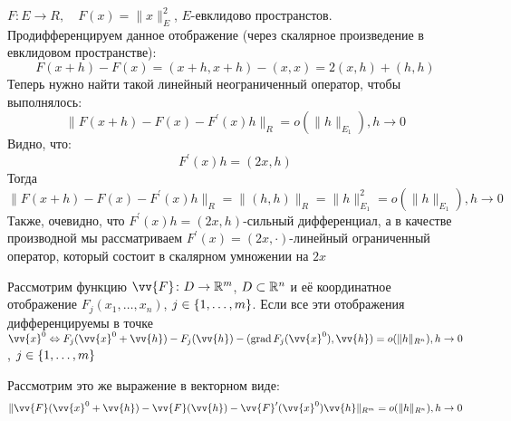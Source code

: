 \begin{example}
    $F \colon E \to R, \quad F(x)=\|x\|^2_E$, $E$-евклидово пространстов.\\ Продифференцируем данное отображение (через скалярное произведение в евклидовом пространстве)$\colon$
    \[
        F(x+h)-F(x)=(x+h, x+h)-(x,x)=2(x, h)+(h, h)
    \]
    Теперь нужно найти такой линейный неограниченный оператор, чтобы выполнялось$\colon$
    \[
        \|F(x+h)-F(x)-F^\prime(x) h\|_R=o(\|h\|_{E_1}), h \to 0
    \]
    Видно, что$\colon$
    \[
        F^\prime(x) h = (2x, h)
    \]
    Тогда
    \[
        \|F(x+h)-F(x)-F^\prime(x) h\|_R = \|(h, h)\|_R = \|h\|^2_{E_1} = o(\|h\|_{E_1}), h \to 0
    \]
    Также, очевидно, что $F^\prime(x) h = (2x, h)$-сильный дифференциал, а в качестве производной мы рассматриваем $F^\prime(x)=(2x, \cdot)$-линейный ограниченный оператор, который состоит в скалярном умножении на $2x$
\end{example}

\begin{example}
    Рассмотрим функцию $\vv{F} \colon D \to \R^m$, $D \subset \mathbb{R}^n$ и её координатное отображение $F_j(x_1, \ldots, x_n)$, $j \in \{1, \ldots, m\}$. Если все эти отображения дифференцируемы в точке $\vv{x}^0 \Lra F_j(\vv{x}^0 + \vv{h}) - F_j (\vv{h}) - (\grad F_j (\vv{x}^0), \vv{h}) = o(\|h\|_{R^n}), h \to 0$, $j \in \{1, \ldots, m\}$
    
    Рассмотрим это же выражение в векторном виде:
    \[
        \|\vv{F}(\vv{x}^0+\vv{h})-\vv{F} (\vv{h}) - \vv{F}^\prime(\vv{x}^0)\vv{h}\|_{R^m} = o(\|h\|_{R^n}), h \to 0
    \]
\end{example}